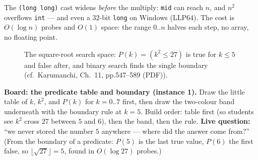 \documentclass[11pt]{article}
\begin{document}
The \texttt{(long long)} cast widens \emph{before} the multiply: \texttt{mid} can reach $n$, and $n^2$ overflows \texttt{int} --- and even a $32$-bit \texttt{long} on Windows (LLP64). The cost is $O(\log n)$ probes and $O(1)$ space: the range $0..n$ halves each step, no array, no floating point.

\begin{figure}[h]
  \centering
  \caption{The square-root search space: $P(k) = (k^2 \le 27)$ is true for $k \le 5$ and false after, and binary search finds the single boundary (cf.\ Karumanchi, Ch.~11, pp.547--589 (PDF)).}
  \label{fig:isqrt}
\end{figure}

\textbf{Board: the predicate table and boundary (instance 1).} Draw the little table of $k$, $k^2$, and $P(k)$ for $k = 0..7$ first, then draw the two-colour band underneath with the boundary rule at $k = 5$. Build order: table first (so students see $k^2$ cross $27$ between $5$ and $6$), then the band, then the rule. \textbf{Live question:} ``we never stored the number $5$ anywhere --- where did the answer come from?'' (From the boundary of a predicate: $P(5)$ is the last true value, $P(6)$ the first false, so $\lfloor\sqrt{27}\rfloor = 5$, found in $O(\log 27)$ probes.)
\end{document}
